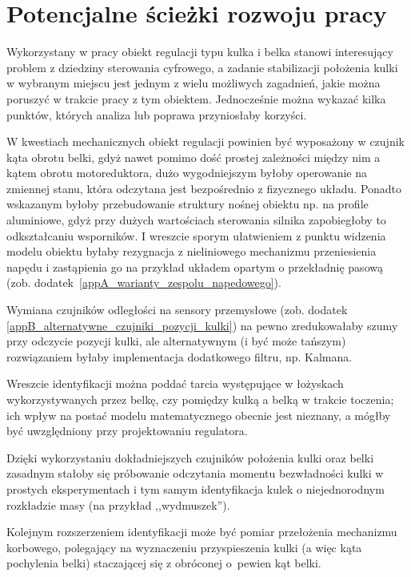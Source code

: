 \section{Potencjalne ścieżki rozwoju pracy}

Wykorzystany w pracy obiekt regulacji typu kulka i belka stanowi interesujący problem z dziedziny sterowania cyfrowego, a zadanie stabilizacji położenia kulki w wybranym miejscu jest jednym z wielu możliwych zagadnień, jakie można poruszyć w trakcie pracy z tym obiektem. Jednocześnie można wykazać kilka punktów, których analiza lub poprawa przyniosłaby korzyści.

W kwestiach mechanicznych obiekt regulacji powinien być wyposażony w czujnik kąta obrotu belki, gdyż nawet pomimo dość prostej zależności między nim a kątem obrotu motoreduktora, dużo wygodniejszym byłoby operowanie na zmiennej stanu, która odczytana jest bezpośrednio z fizycznego układu. Ponadto wskazanym byłoby przebudowanie struktury nośnej obiektu np. na profile aluminiowe, gdyż przy dużych wartościach sterowania silnika zapobiegłoby to odkształcaniu wsporników. I wreszcie sporym ułatwieniem z punktu widzenia modelu obiektu byłaby rezygnacja z nieliniowego mechanizmu przeniesienia napędu i zastąpienia go na przykład układem opartym o przekładnię pasową (zob. dodatek~\ref{appA_warianty_zespolu_napedowego}).

Wymiana czujników odległości na sensory przemysłowe (zob. dodatek \ref{appB_alternatywne_czujniki_pozycji_kulki}) na pewno zredukowałaby szumy przy odczycie pozycji kulki, ale alternatywnym (i być może tańszym) rozwiązaniem byłaby implementacja dodatkowego filtru, np. Kalmana.

Wreszcie identyfikacji można poddać tarcia występujące w łożyskach wykorzystywanych przez belkę, czy pomiędzy kulką a belką w trakcie toczenia; ich wpływ na postać modelu matematycznego obecnie jest nieznany, a mógłby być uwzględniony przy projektowaniu regulatora.

Dzięki wykorzystaniu dokładniejszych czujników położenia kulki oraz belki zasadnym stałoby się próbowanie odczytania momentu bezwładności kulki w prostych eksperymentach i tym samym identyfikacja kulek o niejednorodnym rozkładzie masy (na przykład ,,wydmuszek'').

Kolejnym rozszerzeniem identyfikacji może być pomiar przełożenia mechanizmu korbowego, polegający na wyznaczeniu przyspieszenia kulki (a więc kąta pochylenia belki) staczającej się z obróconej o~pewien kąt belki.

